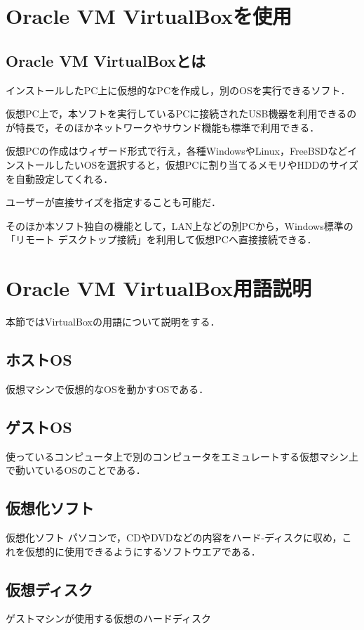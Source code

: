 \section{Oracle VM VirtualBoxを使用}
\subsection{Oracle VM VirtualBoxとは}
インストールしたPC上に仮想的なPCを作成し，別のOSを実行できるソフト．

仮想PC上で，本ソフトを実行しているPCに接続されたUSB機器を利用できるのが特長で，そのほかネットワークやサウンド機能も標準で利用できる．

仮想PCの作成はウィザード形式で行え，各種WindowsやLinux，FreeBSDなどインストールしたいOSを選択すると，仮想PCに割り当てるメモリやHDDのサイズを自動設定してくれる．

ユーザーが直接サイズを指定することも可能だ．

そのほか本ソフト独自の機能として，LAN上などの別PCから，Windows標準の「リモート デスクトップ接続」を利用して仮想PCへ直接接続できる\cite{oracle}．



\section{Oracle VM VirtualBox用語説明}
本節ではVirtualBoxの用語について説明をする．
\subsection{ホストOS}
仮想マシンで仮想的なOSを動かすOSである．

\subsection{ゲストOS}
使っているコンピュータ上で別のコンピュータをエミュレートする仮想マシン上で動いているOSのことである．

\subsection{仮想化ソフト}仮想化ソフト
パソコンで，CDやDVDなどの内容をハード-ディスクに収め，これを仮想的に使用できるようにするソフトウエアである．



\subsection{仮想ディスク}
ゲストマシンが使用する仮想のハードディスク


